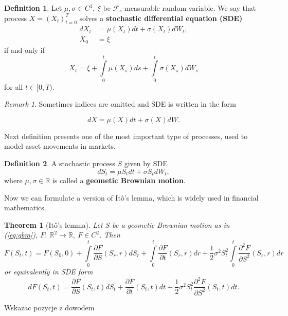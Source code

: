 \documentclass[a4paper,12pt, oneside]{book}
\newtheorem{thm}{Theorem}[section]
\theoremstyle{definition}
\newtheorem{mydef}{Definition}[section]
\theoremstyle{remark}
\newtheorem{remark}{Remark}
\def\R{{\mathbb{R}}}
\begin{document}
\begin{mydef}
\label{def:SDE}
 Let $\mu, \sigma \in C^1,\ \xi$ be $\mathcal{F}_s$-measurable random variable. We say that process $X=(X_t)_{t=0}^T$ solves a \textbf{stochastic differential equation (SDE)}
 \begin{equation*}
 \begin{split}
   dX_t &= \mu(X_t)dt + \sigma(X_t) dW_t,\\
   X_0 &= \xi  
 \end{split}  
 \end{equation*}
 if and only if
 \[X_t = \xi + \int\limits_0^t \mu(X_s)ds + \int\limits_0^t\sigma(X_s) dW_s\]
for all $t \in [0,T)$.
\end{mydef}
\begin{remark}
 Sometimes indices are omitted and SDE is written in the form
\end{remark}
\[ dX = \mu(X)dt + \sigma(X) dW. \]

Next definition presents one of the most important type of processes, used to model asset movements in markets.
\begin{mydef}
 A stochastic process $S$ given by SDE
 \begin{equation}
  dS_t = \mu S_t dt + \sigma S_t dW_t, 
  \label{eq:gbm}
 \end{equation}
where $\mu,\sigma \in \R$ is called a \textbf{geometic Brownian motion}.
\end{mydef}

Now we can formulate a version of It\^{o}'s lemma, which is widely used in financial mathematics.
\begin{thm}[It\^{o}'s lemma]
 \label{thm:ito}
  Let $S$ be a geometic Brownian motion as in (\ref{eq:gbm}), $F:\ \R^2 \rightarrow \R,\ F \in C^2$. Then 
  \begin{equation*}
   F(S_t, t) = F(S_0, 0) + \int\limits_0^t \frac{\partial F}{\partial S}(S_r,r)dS_r + \int\limits_0^t \frac{\partial F}{\partial t}(S_r,r)dr + \frac{1}{2}\sigma^2 S_t^2 \int\limits_0^t \frac{\partial^2 F}{\partial S^2}(S_r,r)dr
  \end{equation*}
  or equivalently in SDE form
  \begin{equation}
   \label{eq:ito}
   dF(S_t, t) = \frac{\partial F}{\partial S}(S_t,t)dS_t + \frac{\partial F}{\partial t}(S_t,t)dt + \frac{1}{2}\sigma^2 S_t^2 \frac{\partial^2 F}{\partial S^2}(S_t,t)dt   .
  \end{equation}  
\end{thm}
{\Large \color{red} Wskazac pozycje z dowodem}
\end{document}
